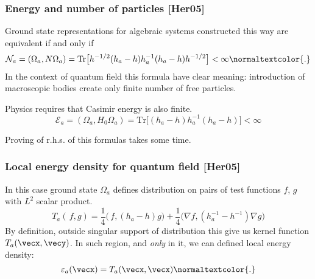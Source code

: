 \documentclass[10pt,t]{beamer}  %
\newcommand{\Ec}{\mathcal{E}}
\begin{document}
\begin{frame}
  \frametitle{Energy and number of particles [Her05]}


  Ground state representations for algebraic systems constructed this
  way are equivalent if and only if
  \begin{equation}
    \label{eq:12}
    \mathcal{N}_{ a } = ( \Omega_{ a }, N \Omega_{ a } )
    =
    \textrm{Tr}\big[ h^{ -1/2 } ( h_{ a } - h ) h_{ a }^{ -1 }
    ( h_{ a } - h ) h^{ -1/2 } \big] < \infty\normaltextcolor{.}
  \end{equation}
  In the context of quantum field this formula have clear meaning:
  introduction of macroscopic bodies create only finite number of free
  particles.

  \vspace{1em}


  Physics requires that Casimir energy is also finite.
  \begin{equation}
    \label{eq:13}
    \Ec_{ a } = ( \Omega_{ a }, H_{ 0 } \Omega_{ a } )
    =
    \textrm{Tr}\big[ ( h_{ a } - h ) h_{ a }^{ -1 } ( h_{ a } - h ) \big]
    < \infty
  \end{equation}

  Proving of r.h.s. of this formulas takes some time.

\end{frame}





\begin{frame}
  \frametitle{Local energy density for quantum field [Her05]}


  In this case ground state $\Omega_{ a }$ defines distribution on
  pairs of test functions $f$, $g$ with $L^{ 2 }$ scalar product.
  \begin{equation}
    \label{eq:14}
    T_{ a }( \, f, g )
    =
    \frac{ 1 }{ 4 } \big( \, f, ( h_{ a } - h ) g \big)
    + \frac{ 1 }{ 4 } \big( \nabla f, ( h_{ a }^{ -1 } - h^{ -1 } )
    \nabla g \big)
  \end{equation}
  By definition, outside singular support of distribution this give us
  kernel function $T_{ a }( \vecx, \vecy )$. In such region, and
  \emph{only} in it, we can defined local energy density:
  \begin{equation}
    \label{eq:15}
    \varepsilon_{ a }( \vecx ) = T_{ a }( \vecx, \vecx )\normaltextcolor{.}
  \end{equation}

\end{frame}
\end{document}

